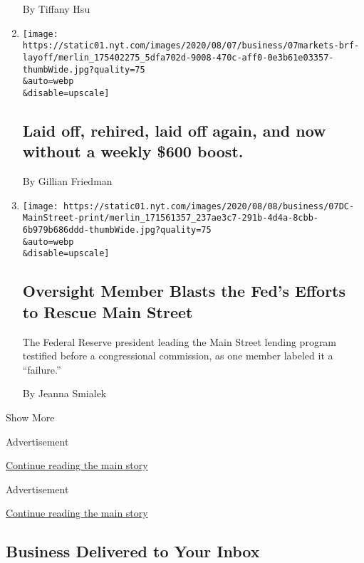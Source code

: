 \begin{enumerate}
  By Tiffany Hsu
\item
  \href{/2020/08/07/business/laid-off-rehired-laid-off-again-and-now-without-a-weekly-600-boost.html}{}

  \texttt{[image: https://static01.nyt.com/images/2020/08/07/business/07markets-brf-layoff/merlin\_175402275\_5dfa702d-9008-470c-aff0-0e3b61e03357-thumbWide.jpg?quality=75\\\&auto=webp\\\&disable=upscale]}

  \hypertarget{laid-off-rehired-laid-off-again-and-now-without-a-weekly-600-boost}{%
  \subsection{Laid off, rehired, laid off again, and now without a
  weekly \$600
  boost.}\label{laid-off-rehired-laid-off-again-and-now-without-a-weekly-600-boost}}

  By Gillian Friedman
\item
  \href{/2020/08/07/business/economy/federal-reserve-main-street-lending.html}{}

  \texttt{[image: https://static01.nyt.com/images/2020/08/08/business/07DC-MainStreet-print/merlin\_171561357\_237ae3c7-291b-4d4a-8cbb-6b979b686ddd-thumbWide.jpg?quality=75\\\&auto=webp\\\&disable=upscale]}

  \hypertarget{oversight-member-blasts-the-feds-efforts-to-rescue-main-street}{%
  \subsection{Oversight Member Blasts the Fed's Efforts to Rescue Main
  Street}\label{oversight-member-blasts-the-feds-efforts-to-rescue-main-street}}

  The Federal Reserve president leading the Main Street lending program
  testified before a congressional commission, as one member labeled it
  a ``failure.''

  By Jeanna Smialek
\end{enumerate}

Show More

Advertisement

\protect\hyperlink{after-mid2}{Continue reading the main story}

Advertisement

\protect\hyperlink{after-mktg}{Continue reading the main story}

\hypertarget{business-delivered-to-your-inbox}{%
\subsection{Business Delivered to Your
Inbox}\label{business-delivered-to-your-inbox}}

